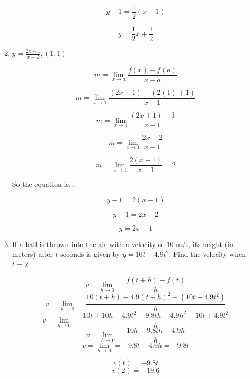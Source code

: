 \documentclass{article}
\begin{document}
\begin{enumerate}
			$$y - 1 = \frac{1}{2}(x-1)$$

			$$y = \frac{1}{2}x + \frac{1}{2}$$

		\item $y = \frac{2x + 1}{x+2}, (1,1)$

			$$m = \lim \limits _{x \to a} \frac{f(x) - f(a)}{x -a}$$

			$$m = \lim \limits _{x \to 1} \frac{(2x+1) - (2(1)+1)}{x-1}$$

			$$m = \lim \limits _{x \to 1} \frac{(2x+1) - 3}{x-1}$$

			$$m = \lim \limits _{x \to 1} \frac{2x-2}{x-1}$$

			$$m = \lim \limits _{x \to 1} \frac{2(x-1)}{x-1} = 2$$

			So the equation is...

			$$y - 1 = 2(x - 1)$$

			$$y - 1 = 2x - 2$$

			$$y = 2x - 1$$


		\item If a ball is thrown into the air with a velocity of 10 m/s, its height
			(in meters) after $t$ seconds is given by $y = 10t - 4.9t^2$. Find the
			velocity when $t = 2$.

			$$v = \lim \limits _{h \to 0} = \frac{f(t+h) - f(t)}{h}$$
			$$v = \lim \limits _{h \to 0} = \frac{10(t+h) - 4.9(t+h)^2 - (10t - 4.9t^2)}{h}$$
			$$v = \lim \limits _{h \to 0} = \frac{10t + 10h - 4.9t^2 - 9.8th - 4.9h^2 - 10t + 4.9t^2}{h}$$
			$$v = \lim \limits _{h \to 0} = \frac{10h - 9.8th - 4.9h}{h}$$
			$$v = \lim \limits _{h \to 0} = -9.8t - 4.9 h = -9.8t$$

			$$v(t) = -9.8t$$
			$$v(2) = -19.6$$
	\end{enumerate}
\end{document}
